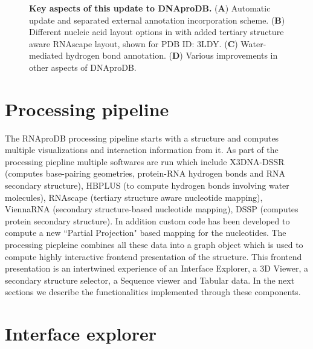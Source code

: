 \begin{center}
    \begin{figure}
        \caption[Key aspects of this update to DNAproDB.]{\textbf{Key aspects of this update to DNAproDB.} ({\bf A}) Automatic update and separated external annotation incorporation scheme.  ({\bf B})  Different nucleic acid layout options in with added tertiary structure aware RNAscape layout, shown for PDB ID: 3LDY. ({\bf C}) Water-mediated hydrogen bond annotation. ({\bf D}) Various improvements in other aspects of DNAproDB. }
  \label{fig:rnaprodb1}
\end{figure}
\end{center}

\section{Processing pipeline}
The RNAproDB processing pipeline starts with a structure and computes multiple visualizations and interaction information from it. As part of the processing piepline multiple softwares are run which include X3DNA-DSSR (computes base-pairing geometries, protein-RNA hydrogen bonds and RNA secondary structure), HBPLUS (to compute hydrogen bonds involving water molecules), RNAscape (tertiary structure aware nucleotide mapping), ViennaRNA (secondary structure-based nucleotide mapping), DSSP (computes protein secondary structure). In addition custom code has been developed to compute a new ``Partial Projection" based mapping for the nucleotides. The processing piepleine combines all these data into a graph object which is used to compute highly interactive frontend presentation of the structure. This frontend presentation is an intertwined experience of an Interface Explorer, a 3D Viewer, a secondary structure selector, a Sequence viewer and Tabular data. In the next sections we describe the functionalities implemented through these components.

\section{Interface explorer}

